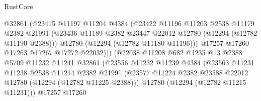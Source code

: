 \begin{lexlean}{RustCore}
\begin{coremodule}
                                  @32861
                                  (@23415
                                    @11197
                                    @11204
                                    @4384
                                    (@23422
                                      @11196
                                      @11203
                                      @2538
                                      @11179
                                      @2382
                                      @21991
                                      (@23436
                                        @11189
                                        @2382
                                        @23447
                                        @22012
                                        @12780
                                        (@12294 (@12782 @11190 @2388)))
                                      @12780
                                      (@12294 (@12782 @11180 @11196)))
                                    @17257
                                    @17260
                                    @17263
                                    @17267
                                    @17272
                                    @22032)))
                              (@22038
                                @11208
                                @682
                                @1235
                                @13
                                @2388
                                @5709
                                @11232
                                @11241
                                @32861
                                (@23556
                                  @11232
                                  @11239
                                  @4384
                                  (@23563
                                    @11231
                                    @11238
                                    @2538
                                    @11214
                                    @2382
                                    @21991
                                    (@23577
                                      @11224
                                      @2382
                                      @23588
                                      @22012
                                      @12780
                                      (@12294 (@12782 @11225 @2388)))
                                    @12780
                                    (@12294 (@12782 @11215 @11231)))
                                  @17257
                                  @17260

\end{coremodule}
\end{lexlean}
